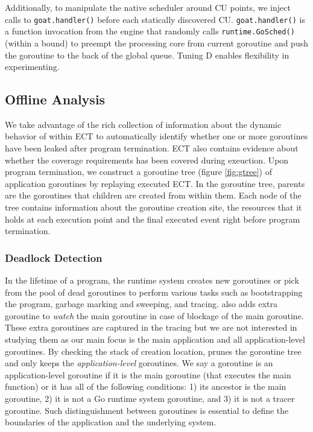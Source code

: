 Additionally, to manipulate the native scheduler around CU points, we inject calls to \texttt{goat.handler()} before each statically discovered CU. \texttt{goat.handler()} is a function invocation from the \goat engine that randomly calls \texttt{runtime.GoSched()} (within a bound) to preempt the processing core from current goroutine and push the goroutine to the back of the global queue.
%
Tuning D enables flexibility in experimenting.

\subsection{Offline Analysis}
We take advantage of the rich collection of information about the dynamic behavior of within ECT to automatically identify whether one or more goroutines have been leaked after program termination.
%
ECT also contains evidence about whether the coverage requirements has been covered during exeuction.
%
Upon program termination, we construct a goroutine tree (figure \ref{fig:gtree}) of application goroutines by replaying executed ECT.
%
In the goroutine tree, parents are the goroutines that children are created from within them.
%
Each node of the tree contains information about the goroutine creation site, the resources that it holds at each execution point and the final executed event right before program termination.

\subsubsection{Deadlock Detection}
\label{sec:dld}
In the lifetime of a program, the runtime system creates new goroutines or pick from the pool of dead goroutines to perform various tasks such as bootstrapping the program, garbage marking and sweeping, and tracing.
%
\goat also adds extra goroutine to \textit{watch} the main goroutine in case of blockage of the main goroutine.
%
These extra goroutines are captured in the tracing but we are not interested in studying them as our main focus is the main application and all application-level goroutines.
%
By checking the stack of creation location, \goat prunes the goroutine tree and only keeps the \textit{application-level} goroutines.
%
We say a goroutine is an application-level goroutine if it is the main goroutine (that executes the main function) or it has all of the following conditions:
1) its ancestor is the main goroutine,
2) it is not a Go runtime system goroutine, and
3) it is not a tracer goroutine.
Such distinguishment between goroutines is essential to define the boundaries of the application and the underlying system.

